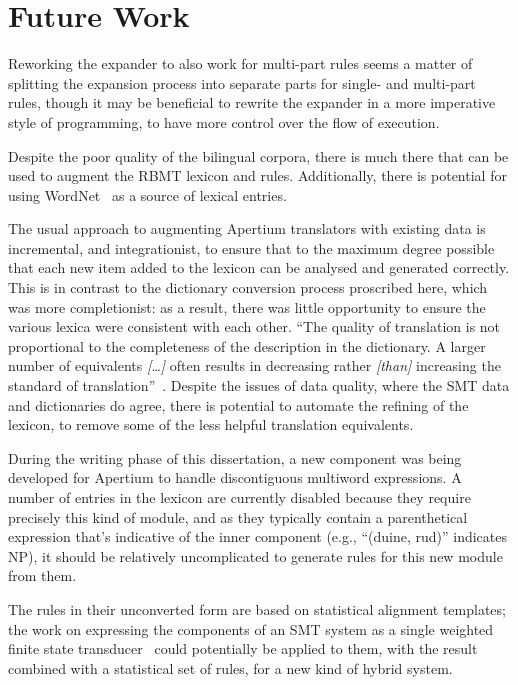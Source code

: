 \section{Future Work}

Reworking the expander to also work for multi-part rules seems a matter of splitting the expansion
process into separate parts for single- and multi-part rules, though it may be beneficial to
rewrite the expander in a more imperative style of programming, to have more control over the
flow of execution.

Despite the poor quality of the bilingual corpora, there is much there that can be used to augment
the RBMT lexicon and rules. Additionally, there is potential for using WordNet~\citep{oregan2016lemongawn}
as a source of lexical entries.

The usual approach to augmenting Apertium translators with existing data is incremental, 
and integrationist, to ensure that to the maximum degree possible that each new item added 
to the lexicon can be analysed and generated correctly. This is in contrast to the dictionary conversion process
proscribed here, which was more completionist: as a result, there was little opportunity to 
ensure the various lexica were consistent with each other. ``The quality of translation is not
proportional to the completeness of the
description  in  the  dictionary.  A  larger
number  of  equivalents  \textit{[\dots]}  often  results  in
decreasing  rather  \textit{[than]}  increasing  the
standard of translation''~\citep[p. 104]{jassem04pwn}. Despite the issues of data quality, where
the SMT data and dictionaries do agree, there is potential to automate the refining of the lexicon,
to remove some of the less helpful translation equivalents.


During the writing phase of this dissertation, a new component was being developed for Apertium
to handle discontiguous multiword expressions. A number of entries in the lexicon are currently disabled
because they require precisely this kind of module, and as they typically contain a parenthetical
expression that's indicative of the inner component (e.g., ``(duine, rud)'' indicates NP), it should
be relatively uncomplicated to generate rules for this new module from them.

The rules in their unconverted form are based on statistical alignment templates; the work on expressing
the components of an SMT system as a single weighted finite state transducer~\citep{Iglesias:2009:HPT:1620754.1620817}
could potentially be applied to them, with the result combined with a statistical set of rules, for a new
kind of hybrid system. 

